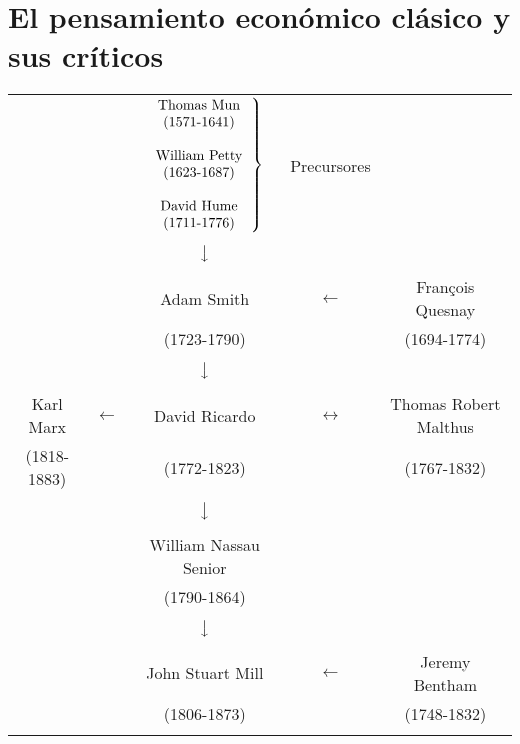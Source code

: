 \documentclass[10pt]{book}
\begin{document}
 
\part{El pensamiento económico clásico y sus críticos}

\begin{tcolorbox}[colback=black!3!white,colframe=black!80!white,title=Influencia en el pensamiento económico clásico]	
    \begin{center}
	\vspace{.3cm}
	\begin{tabular}{ccccc}
	    &&
	    $\left.
	    \begin{tabular}{c}
		Thomas Mun\\
		(1571-1641)\\\\
		William Petty\\
		(1623-1687)\\\\
		David Hume\\
		(1711-1776)
	    \end{tabular}
	    \right\}$
	    &\small Precursores&\\\\
	&&$\big\downarrow$&&\\\\
	&&Adam Smith&$\longleftarrow$&François Quesnay\\
	&&(1723-1790)&&(1694-1774)\\\\
	&&$\big\downarrow$&&\\\\
	Karl Marx&$\longleftarrow$&David Ricardo&$\longleftrightarrow$&Thomas Robert Malthus\\
	    (1818-1883)&&(1772-1823)&&(1767-1832)\\\\
	&&$\big\downarrow$&&\\\\
		       &&William Nassau Senior&&\\
		       &&(1790-1864)&&\\\\
	&&$\big\downarrow$&&\\\\
		       &&John Stuart Mill&$\longleftarrow$&Jeremy Bentham\\
		       &&(1806-1873)&&(1748-1832)\\\\
	\end{tabular}
    \end{center}
\end{tcolorbox}
\end{document}
